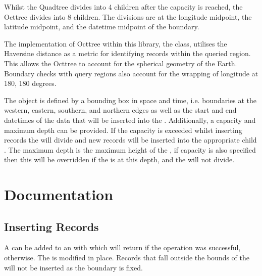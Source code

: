 \documentclass[letterpaper,10pt,english]{sphinxmanual}
\begin{document}
\sphinxAtStartPar
Whilst the Quadtree divides into 4 children after the capacity is reached, the Octtree divides into 8 children. The
divisions are at the longitude midpoint, the latitude midpoint, and the datetime midpoint of the boundary.

\sphinxAtStartPar
The implementation of Octtree within this library, the  class, utilises the Haversine distance as a metric
for identifying records within the queried region. This allows the Octtree to account for the spherical geometry of the
Earth. Boundary checks with query regions also account for the wrapping of longitude at \sphinxhyphen{}180, 180 degrees.

\sphinxAtStartPar
The  object is defined by a bounding box in space and time, i.e. boundaries at the western, eastern,
southern, and northern edges as well as the start and end datetimes of the data that will be inserted into the .
Additionally, a capacity and maximum depth can be provided. If the capacity is exceeded whilst inserting records the
 will divide and new records will be inserted into the appropriate child . The maximum depth is the
maximum height of the , if capacity is also specified then this will be overridden if the  is at this
depth, and the  will not divide.


\section{Documentation}
\label{\detokenize{octtree:documentation}}

\subsection{Inserting Records}
\label{\detokenize{octtree:inserting-records}}
\sphinxAtStartPar
A  can be added to an  with  which will return  if the operation
was successful,  otherwise. The  is modified in place. Records that fall outside the bounds of the
 will not be inserted as the boundary is fixed.
\end{document}
